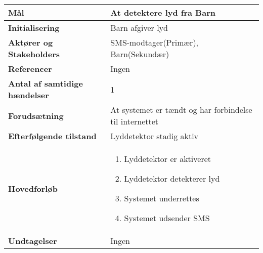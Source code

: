 \begin{table}[H] \centering
\begin{tabular}{|p{6cm}|p{8cm}|}
	\hline
		\textbf{Mål} &
			At detektere lyd fra Barn \\\hline
		\textbf{Initialisering} &
			Barn afgiver lyd \\\hline
		\textbf{Aktører og Stakeholders} &
			SMS-modtager(Primær), Barn(Sekundær) \\\hline
		\textbf{Referencer}						
			&Ingen \\\hline
		\textbf{Antal af samtidige hændelser} &
			1 \\\hline
		\textbf{Forudsætning} & 
			At systemet er tændt og har forbindelse til internettet \\\hline
		\textbf{Efterfølgende tilstand} &
			Lyddetektor stadig aktiv \\\hline
		\textbf{Hovedforløb} &
			\begin{enumerate}

	
				\item Lyddetektor er aktiveret
												
				\item Lyddetektor detekterer lyd 
				
				\item Systemet underrettes
												
				\item Systemet udsender SMS
								
			\end{enumerate}\\\hline
	
		\textbf{Undtagelser} &
			Ingen \\\hline
			
	\end{tabular}
	\label{UC5} 
\end{table}

